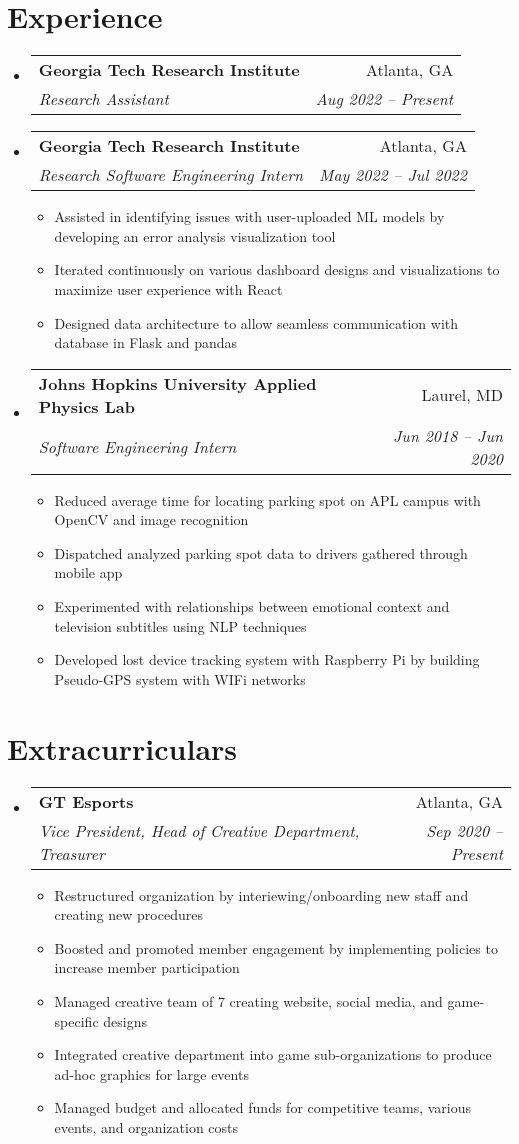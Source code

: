 \documentclass[a4paper,11pt]{extarticle}
\makeatletter
\newcommand{\resumeItem}[1]{
	\item\small{
		#1 \vspace{-1pt}
	}
}
\newcommand{\resumeSubheading}[4]{
	\vspace{-1pt}\item
		\begin{tabular*}{1\linewidth}{l@{\extracolsep{\fill}}r}
			\textbf{#1} & #2 \\
			\textit{#3} & \textit{#4} \\
		\end{tabular*}\vspace{-3pt}
}
\newcommand{\resumeSubHeadingListStart}{\begin{itemize}[leftmargin=0.15in,label={}]}
\newcommand{\resumeSubHeadingListEnd}{\end{itemize}}
\newcommand{\resumeItemListStart}{\begin{itemize}\vspace{-3pt}}
\newcommand{\resumeItemListEnd}{\end{itemize}\vspace{-3pt}}
\makeatother
\begin{document}
\section{Experience}
	\resumeSubHeadingListStart
        \resumeSubheading
            {Georgia Tech Research Institute}
            {Atlanta, GA}
            {Research Assistant}
            {Aug 2022 -- Present}
        \resumeSubheading
            {Georgia Tech Research Institute}
            {Atlanta, GA}
            {Research Software Engineering Intern}
            {May 2022 -- Jul 2022}
        \resumeItemListStart
            \resumeItem{Assisted in identifying issues with user-uploaded ML
                models by developing an error analysis visualization tool}
            \resumeItem{Iterated continuously on various dashboard designs and
                visualizations to maximize user experience with React}
            \resumeItem{Designed data architecture to allow seamless
                communication with database in Flask and pandas}
        \resumeItemListEnd
        \resumeSubheading
            {Johns Hopkins University Applied Physics Lab}
            {Laurel, MD}
            {Software Engineering Intern}
            {Jun 2018 -- Jun 2020}
        \resumeItemListStart
            \resumeItem{Reduced average time for locating parking spot on APL
                campus with OpenCV and image recognition}
            \resumeItem{Dispatched analyzed parking spot data to drivers
                gathered through mobile app}
            \resumeItem{Experimented with relationships between emotional
                context and television subtitles using NLP techniques}
            \resumeItem{Developed lost device tracking system with Raspberry
                Pi by building Pseudo-GPS system with WIFi networks}
        \resumeItemListEnd
	\resumeSubHeadingListEnd

\section{Extracurriculars}
	\resumeSubHeadingListStart
        \resumeSubheading
            {GT Esports}
            {Atlanta, GA}
            {Vice President, Head of Creative Department, Treasurer}
            {Sep 2020 -- Present}
        \resumeItemListStart
            \resumeItem{Restructured organization by interiewing/onboarding new
                staff and creating new procedures}
            \resumeItem{Boosted and promoted member engagement by implementing
                policies to increase member participation}
            \resumeItem{Managed creative team of 7 creating website, social
                media, and game-specific designs}
            \resumeItem{Integrated creative department into game sub-organizations
                to produce ad-hoc graphics for large events}
             \resumeItem{Managed budget and allocated funds for competitive teams, various events,
                and organization costs}
        \resumeItemListEnd
	\resumeSubHeadingListEnd
\end{document}

